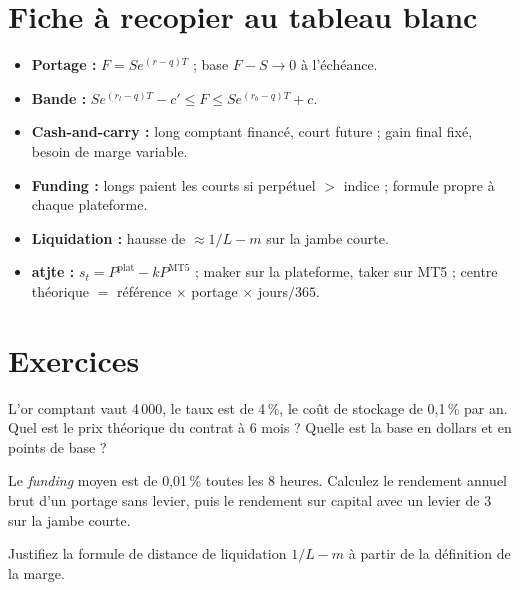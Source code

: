 \section{Fiche à recopier au tableau blanc}

\begin{whiteboard}
\begin{itemize}[leftmargin=1.2em]
\item \textbf{Portage :} $F = Se^{(r-q)T}$ ; base $F - S\to0$ à l'échéance.
\item \textbf{Bande :} $Se^{(r_l-q)T} - c' \le F \le Se^{(r_b-q)T} + c$.
\item \textbf{Cash-and-carry :} long comptant financé, court future ; gain final fixé, besoin de marge variable.
\item \textbf{Funding :} longs paient les courts si perpétuel $>$ indice ; formule propre à chaque plateforme.
\item \textbf{Liquidation :} hausse de $\approx 1/L - m$ sur la jambe courte.
\item \textbf{atjte :} $s_t = P^{\text{plat}} - kP^{\text{MT5}}$ ; maker sur la plateforme, taker sur MT5 ; centre théorique $=$ référence $\times$ portage $\times$ jours$/365$.
\end{itemize}
\end{whiteboard}

\section{Exercices}

\begin{exercise}
L'or comptant vaut 4\,000, le taux est de 4\,\%, le coût de stockage de 0,1\,\% par an. Quel est le prix théorique du contrat à 6 mois ? Quelle est la base en dollars et en points de base ?
\end{exercise}

\begin{exercise}
Le \emph{funding} moyen est de 0,01\,\% toutes les 8 heures. Calculez le rendement annuel brut d'un portage sans levier, puis le rendement sur capital avec un levier de 3 sur la jambe courte.
\end{exercise}

\begin{exercise}
Justifiez la formule de distance de liquidation $1/L - m$ à partir de la définition de la marge.
\end{exercise}

